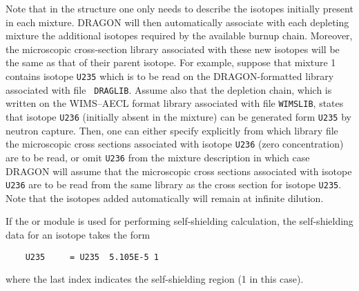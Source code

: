 Note that in the structure  one only needs to describe the
isotopes initially present in each mixture. DRAGON will then automatically
associate with each depleting mixture the additional isotopes required by the
available burnup chain. Moreover, the microscopic cross-section library
associated with these new isotopes will be the same as that of their parent
isotope. For example, suppose that mixture 1 contains isotope {\tt U235} which
is to be read on the DRAGON-formatted library associated with file {\tt
DRAGLIB}. Assume also that the depletion chain, which is written on the 
WIMS--AECL format library associated with file {\tt WIMSLIB}, states that isotope
{\tt U236} (initially absent in the mixture) can be generated form {\tt U235} by
neutron capture. Then, one can either specify explicitly from which library file
the microscopic cross sections associated with isotope {\tt U236} (zero
concentration) are to be read, or omit {\tt U236} from the mixture description
in which case DRAGON will assume that the microscopic cross sections associated
with isotope {\tt U236} are to be read from the same library as the cross
section for isotope {\tt U235}. Note that the isotopes added automatically will
remain at infinite dilution.

\vskip 0.15cm

If the  or  module is used for performing self-shielding calculation,
the self-shielding data for an isotope takes the form
\begin{verbatim}
    U235     = U235  5.105E-5 1
\end{verbatim}
\noindent where the last index indicates the self-shielding region (1 in this case). 

\vskip 0.15cm

